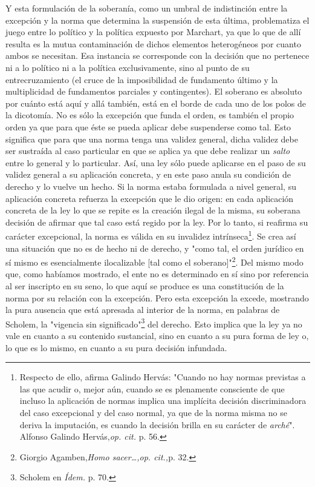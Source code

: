 \documentclass{book}
\begin{document}
Y esta formulación de la soberanía, como un umbral de indistinción entre
la excepción y la norma que determina la suspensión de esta última,
problematiza el juego entre lo político y la política expuesto por
Marchart, ya que lo que de allí resulta es la mutua contaminación de
dichos elementos heterogéneos por cuanto ambos se necesitan. Esa
instancia se corresponde con la decisión que no pertenece ni a lo
político ni a la política exclusivamente, sino al punto de su
entrecruzamiento (el cruce de la imposibilidad de fundamento último y la
multiplicidad de fundamentos parciales y contingentes). El soberano es
absoluto por cuánto está aquí y allá también, está en el borde de cada
uno de los polos de la dicotomía. No es sólo la excepción que funda el
orden, es también el propio orden ya que para que éste se pueda aplicar
debe suspenderse como tal. Esto significa que para que una norma tenga
una validez general, dicha validez debe ser sustraída al caso particular
en que se aplica ya que debe realizar un \emph{salto} entre lo general y
lo particular. Así, una ley sólo puede aplicarse en el paso de su
validez general a su aplicación concreta, y en este paso anula su
condición de derecho y lo vuelve un hecho. Si la norma estaba formulada
a nivel general, su aplicación concreta refuerza la excepción que le dio
origen: en cada aplicación concreta de la ley lo que se repite es la
creación ilegal de la misma, su soberana decisión de afirmar que tal
caso está regido por la ley. Por lo tanto, si reafirma su carácter
excepcional, la norma es válida en su invalidez intrínseca\footnote{Respecto
  de ello, afirma Galindo Hervás: "Cuando no hay normas previstas a las
  que acudir o, mejor aún, cuando se es plenamente consciente de que
  incluso la aplicación de normas implica una implícita decisión
  discriminadora del caso excepcional y del caso normal, ya que de la
  norma misma no se deriva la imputación, es cuando la decisión brilla
  en su carácter de \emph{arché}". Alfonso Galindo Hervás,\emph{op.
  cit.} p. 56.}. Se crea así una situación que no es de hecho ni de
derecho, y "como tal, el orden jurídico en sí mismo es esencialmente
ilocalizable {[}tal como el soberano{]}"\footnote{Giorgio
  Agamben,\emph{Homo sacer\ldots,op. cit.,}p. 32.}. Del mismo modo que,
como habíamos mostrado, el ente no es determinado en sí sino por
referencia al ser inscripto en su seno, lo que aquí se produce es una
constitución de la norma por su relación con la excepción. Pero esta
excepción la excede, mostrando la pura ausencia que está apresada al
interior de la norma, en palabras de Scholem, la "vigencia sin
significado"\footnote{Scholem en \emph{Ídem.} p. 70.} del derecho. Esto
implica que la ley ya no vale en cuanto a su contenido sustancial, sino
en cuanto a su pura forma de ley o, lo que es lo mismo, en cuanto a su
pura decisión infundada.
\end{document}
